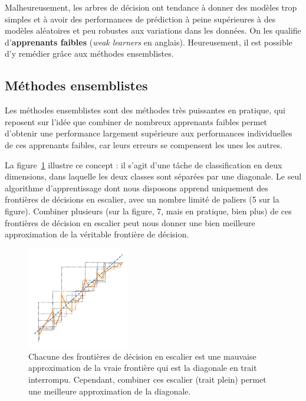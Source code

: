 Malheureusement, les arbres de décision ont tendance à donner des modèles trop
simples et à avoir des performances de prédiction à peine supérieures à des
modèles aléatoires et peu robustes aux variations dans les données. On les
qualifie d'\textbf{apprenants faibles} ({\it weak learners} en
anglais). Heureusement, il est possible d'y remédier grâce aux méthodes
ensemblistes.


\subsection{Méthodes ensemblistes}
Les méthodes ensemblistes sont des méthodes très puissantes en pratique, qui
reposent sur l'idée que combiner de nombreux apprenants faibles permet
d'obtenir une performance largement supérieure aux performances individuelles
de ces apprenants faibles, car leurs erreurs se compensent les unes les autres.

\begin{exemple}
  La figure~\ref{fig:crowd_diagonal} illustre ce concept : il s'agit d'une
  tâche de classification en deux dimensions, dans laquelle les deux classes
  sont séparées par une diagonale. Le seul algorithme d'apprentissage dont nous
  disposons apprend uniquement des frontières de décisions en escalier, avec un
  nombre limité de paliers (5 sur la figure). Combiner plusieurs (sur la
  figure, 7, mais en pratique, bien plus) de ces frontières de décision en
  escalier peut nous donner une bien meilleure approximation de la véritable
  frontière de décision.
\end{exemple}

\begin{figure}[h]
  \centering
  \includegraphics[width=0.4\textwidth]{figures/nonlin/crowd_diagonal}
  \caption{Chacune des frontières de décision en escalier est une mauvaise
    approximation de la vraie frontière qui est la diagonale en trait
    interrompu. Cependant, combiner ces escalier (trait plein) permet une
    meilleure approximation de la diagonale.}
  \label{fig:crowd_diagonal}
\end{figure}


